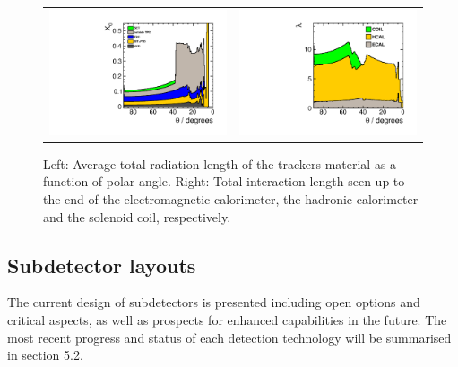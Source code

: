 \begin{figure}[t!]
\begin{tabular}{cc}
\includegraphics[width=0.5\hsize]{Modelling/fig/ILD_l5_v02_matbudget_tracker_85deg.pdf} &
\includegraphics[width=0.5\hsize]{Modelling/fig/ILD_l5_v02_matbudget_calo_85deg.pdf}
\end{tabular}
\caption[Material in the ILD detector]{Left: Average total radiation length of the trackers material as a function of polar angle. Right: Total interaction length seen up to the end of the electromagnetic calorimeter, the hadronic calorimeter and the solenoid coil, respectively.}
\label{fig:det:material}

\end{figure}

\subsection{Subdetector layouts}

The current design of subdetectors is presented including open options and critical aspects, as well as prospects for enhanced capabilities in the future. The most recent progress and status of each detection technology will be summarised in section 5.2.

\vspace{1cm}
